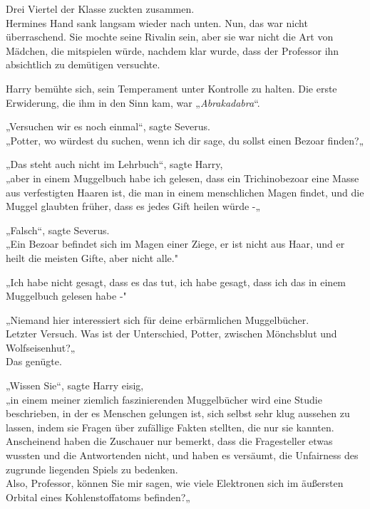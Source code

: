 {Drei Viertel der Klasse zuckten zusammen.\\ Hermines Hand sank langsam wieder nach unten. Nun, das war nicht überraschend. Sie mochte seine Rivalin sein, aber sie war nicht die Art von Mädchen, die mitspielen würde, nachdem klar wurde, dass der Professor ihn absichtlich zu demütigen versuchte.

Harry bemühte sich, sein Temperament unter Kontrolle zu halten. Die erste Erwiderung, die ihm in den Sinn kam, war „\emph{Abrakadabra}“.

„Versuchen wir es noch einmal“, sagte Severus.\\ „Potter, wo würdest du suchen, wenn ich dir sage, du sollst einen Bezoar finden?„

„Das steht auch nicht im Lehrbuch“, sagte Harry,\\ „aber in einem Muggelbuch habe ich gelesen, dass ein Trichinobezoar eine Masse aus verfestigten Haaren ist, die man in einem menschlichen Magen findet, und die Muggel glaubten früher, dass es jedes Gift heilen würde -„

„Falsch“, sagte Severus.\\ „Ein Bezoar befindet sich im Magen einer Ziege, er ist nicht aus Haar, und er heilt die meisten Gifte, aber nicht alle."

„Ich habe nicht gesagt, dass es das tut, ich habe gesagt, dass ich das in einem Muggelbuch gelesen habe -"

„Niemand hier interessiert sich für deine erbärmlichen Muggelbücher.\\ Letzter Versuch. Was ist der Unterschied, Potter, zwischen Mönchsblut und Wolfseisenhut?„\\ Das genügte.

„Wissen Sie“, sagte Harry eisig,\\ „in einem meiner ziemlich faszinierenden Muggelbücher wird eine Studie beschrieben, in der es Menschen gelungen ist, sich selbst sehr klug aussehen zu lassen, indem sie Fragen über zufällige Fakten stellten, die nur sie kannten.\\ Anscheinend haben die Zuschauer nur bemerkt, dass die Fragesteller etwas wussten und die Antwortenden nicht, und haben es versäumt, die Unfairness des zugrunde liegenden Spiels zu bedenken.\\ Also, Professor, können Sie mir sagen, wie viele Elektronen sich im äußersten Orbital eines Kohlenstoffatoms befinden?„

}
